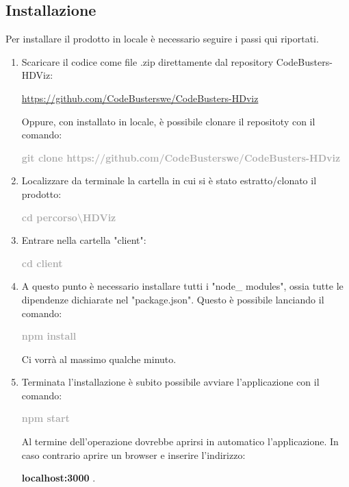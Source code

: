 \subsection{Installazione}
Per installare il prodotto in locale è necessario seguire i passi qui riportati.
\begin{enumerate}
	\item Scaricare il codice come file .zip direttamente dal repository CodeBusters-HDViz:
		\begin{center}
			\textcolor{blue}{\url{https://github.com/CodeBusterswe/CodeBusters-HDviz}}
		\end{center}	
	Oppure, con  installato in locale, è possibile clonare il repositoty con il comando:
		\begin{center}
			\textcolor{darkgray}{\textbf{git clone https://github.com/CodeBusterswe/CodeBusters-HDviz}}
		\end{center}
      
	\item Localizzare da terminale la cartella in cui si è stato estratto/clonato il prodotto:  
		\begin{center}
			\textcolor{darkgray}{\textbf{cd percorso\textbackslash HDViz}}
 		\end{center}	
	\item Entrare nella cartella "client":
		\begin{center}
			\textcolor{darkgray}{\textbf{cd client}}
 		\end{center}	     
	\item A questo punto è necessario installare tutti i "node\_ modules", ossia tutte le dipendenze dichiarate nel "package.json". Questo è possibile lanciando il comando:
		\begin{center}
			\textcolor{darkgray}{\textbf{npm install}}
 		\end{center}		
	Ci vorrà al massimo qualche minuto. 
	\item Terminata l'installazione è subito possibile avviare l'applicazione con il comando:
		\begin{center}
			\textcolor{darkgray}{\textbf{npm start}}
 		\end{center}
	Al termine dell'operazione dovrebbe aprirsi in automatico l'applicazione. In caso contrario aprire un browser e inserire l'indirizzo:
	\begin{center}
		\textbf{localhost:3000} .
	\end{center}		
\end{enumerate}
  			